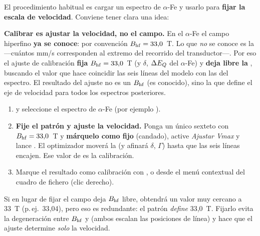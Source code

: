 El procedimiento habitual es cargar un espectro de $\alpha$-Fe y usarlo para
\textbf{fijar la escala de velocidad}. Conviene tener clara una idea:

\begin{aviso}
\textbf{Calibrar es ajustar la velocidad, no el campo.} En el $\alpha$-Fe el
campo hiperfino \textbf{ya se conoce}: por convención $B_{\mathrm{hf}} = 33{,}0$~T. Lo que
\emph{no} se conoce es la  —cuántos mm/s corresponden al extremo del
recorrido del transductor—. Por eso el ajuste de calibración \textbf{fija}
$B_{\mathrm{hf}} = 33{,}0$~T (y $\delta$, $\Delta E_{Q}$ del $\alpha$-Fe) y \textbf{deja libre la
}, buscando el valor que hace coincidir las seis líneas del modelo
con las del espectro. El resultado del ajuste no es un $B_{\mathrm{hf}}$ (es conocido), sino
la  que define el eje de velocidad para todos los espectros
posteriores.
\end{aviso}

\begin{enumerate}[nosep]
  \item {} y seleccione el espectro de $\alpha$-Fe
        (por ejemplo ).
  \item \textbf{Fije el patrón y ajuste la velocidad.} Ponga un único sexteto con
        $B_{\mathrm{hf}} = 33{,}0$~T y \textbf{márquelo como fijo} (candado), active
        \emph{Ajustar Vmax} y lance . El optimizador
        moverá la  (y afinará $\delta$, $\Gamma$) hasta que las seis
        líneas encajen. Ese valor de  es la calibración.
  \item Marque el resultado como calibración con
        , o desde el menú
        contextual del cuadro de fichero (clic derecho).
\end{enumerate}

\begin{nota}
Si en lugar de fijar el campo deja $B_{\mathrm{hf}}$ libre, obtendrá un valor muy cercano a
33~T (p.\,ej.\ 33{,}04), pero eso es redundante: el patrón \emph{define} 33{,}0~T.
Fijarlo evita la degeneración entre $B_{\mathrm{hf}}$ y  (ambos escalan las
posiciones de línea) y hace que el ajuste determine \emph{solo} la velocidad.
\end{nota}


